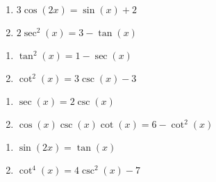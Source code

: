 \begin{multicols}{2}

\begin{enumerate}

\setcounter{enumi}{\value{HW}}

\item  $3\cos(2x) = \sin(x) + 2$
\item  $2\sec^{2}(x) = 3 - \tan(x)$

\setcounter{HW}{\value{enumi}}

\end{enumerate}

\end{multicols}

\begin{multicols}{2}

\begin{enumerate}

\setcounter{enumi}{\value{HW}}

\item  $\tan^{2}(x) = 1-\sec(x)$
\item  $\cot^{2}(x) = 3\csc(x) - 3$

\setcounter{HW}{\value{enumi}}

\end{enumerate}

\end{multicols}

\begin{multicols}{2}

\begin{enumerate}

\setcounter{enumi}{\value{HW}}

\item  $\sec(x) = 2\csc(x)$
\item  $\cos(x)\csc(x)\cot(x) = 6-\cot^{2}(x)$

\setcounter{HW}{\value{enumi}}

\end{enumerate}

\end{multicols}

\begin{multicols}{2}

\begin{enumerate}

\setcounter{enumi}{\value{HW}}

\item  $\sin(2x) = \tan(x)$
\item  $\cot^{4}(x) = 4\csc^{2}(x) - 7$

\setcounter{HW}{\value{enumi}}

\end{enumerate}

\end{multicols}

